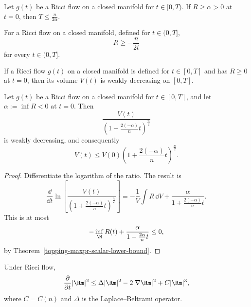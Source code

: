 \begin{corollary}
\label{topping-maxpr-finite-time-blowup}
Let $g(t)$ be a Ricci flow on a closed manifold for $t\in[0,T)$. If
$R\geq\alpha>0$ at $t=0$, then $T\leq\frac{n}{2\alpha}$.
\end{corollary}

\begin{corollary}
\label{topping-maxpr-negative-scalar-lower-bound}
For a Ricci flow on a closed manifold, defined for $t\in(0,T]$,
\[
R\geq-\frac{n}{2t}
\]
for every $t\in(0,T]$.
\end{corollary}

\begin{corollary}
\label{topping-maxpr-volume-decreases}
If a Ricci flow $g(t)$ on a closed manifold is defined for $t\in[0,T]$ and has
$R\geq0$ at $t=0$, then its volume $V(t)$ is weakly decreasing on $[0,T]$.
\end{corollary}

\begin{corollary}
\label{topping-maxpr-volume-ratio}

Let $g(t)$ be a Ricci flow on a closed manifold for $t\in[0,T]$, and let
$\alpha:=\inf R<0$ at $t=0$. Then
\[
\frac{V(t)}{\left(1+\frac{2(-\alpha)}{n}t\right)^{\frac n2}}
\]
is weakly decreasing, and consequently
\[
V(t)\leq V(0)\left(1+\frac{2(-\alpha)}{n}t\right)^{\frac n2}.
\]
\end{corollary}

\begin{proof}
\sketch Differentiate the logarithm of the ratio. The result is
\[
\frac{\dd}{\dd t}\ln\!\left[
\frac{V(t)}{\left(1+\frac{2(-\alpha)}{n}t\right)^{\frac n2}}
\right]
=-\frac{1}{V}\int R\,\dd V
 +\frac{\alpha}{1+\frac{2(-\alpha)}{n}t}.
\]
This is at most
\[
-\inf_{\M}R(t)+\frac{\alpha}{1-\frac{2\alpha}{n}t}\leq0,
\]
by Theorem~\ref{topping-maxpr-scalar-lower-bound}.
\end{proof}

\begin{proposition}
\label{topping-maxpr-curvature-norm-evolution}
Under Ricci flow,
\[
\frac{\partial}{\partial t}|\Rm|^2
\leq\Delta|\Rm|^2-2|\nabla\Rm|^2+C|\Rm|^3,
\]
where $C=C(n)$ and $\Delta$ is the Laplace--Beltrami operator.
\end{proposition}

